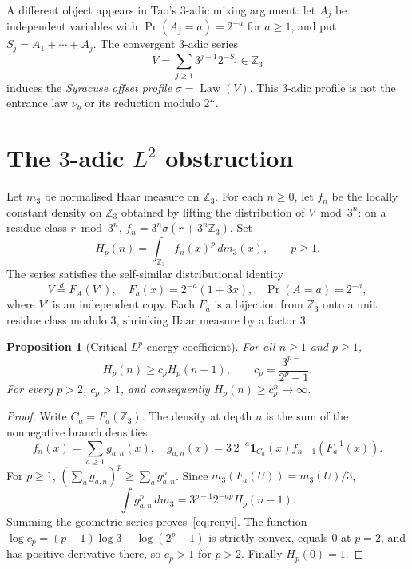 \documentclass[10pt]{amsart}
\newtheorem{proposition}[theorem]{Proposition}
\theoremstyle{definition}\newtheorem{definition}[theorem]{Definition}
\theoremstyle{remark}\newtheorem{remark}[theorem]{Remark}
\newcommand{\Z}{\mathbb Z}
\newcommand{\one}{\mathbf1}
\begin{document}
A different object appears in Tao's $3$-adic mixing argument: let $A_j$ be independent variables with $\Pr(A_j=a)=2^{-a}$ for $a\ge1$, and put $S_j=A_1+\cdots+A_j$. The convergent $3$-adic series
\begin{equation}\label{eq:V}
 V=\sum_{j\ge1}3^{j-1}2^{-S_j}\in\Z_3
\end{equation}
induces the \emph{Syracuse offset profile} $\sigma=\operatorname{Law}(V)$. This $3$-adic profile is not the entrance law $\nu_b$ or its reduction modulo $2^L$.

\section{The $3$-adic $L^2$ obstruction}
Let $m_3$ be normalised Haar measure on $\Z_3$. For each $n\ge0$, let $f_n$ be the locally constant density on $\Z_3$ obtained by lifting the distribution of $V\bmod3^n$: on a residue class $r\bmod3^n$, $f_n=3^n\sigma(r+3^n\Z_3)$. Set
\[
 H_p(n)=\int_{\Z_3}f_n(x)^p\,dm_3(x),\qquad p\ge1.
\]
The series satisfies the self-similar distributional identity
\begin{equation}\label{eq:ifs}
 V\stackrel d=F_A(V'),\quad F_a(x)=2^{-a}(1+3x),\quad\Pr(A=a)=2^{-a},
\end{equation}
where $V'$ is an independent copy. Each $F_a$ is a bijection from $\Z_3$ onto a unit residue class modulo $3$, shrinking Haar measure by a factor $3$.

\begin{proposition}[Critical $L^p$ energy coefficient]\label{prop:p}
For all $n\ge1$ and $p\ge1$,
\begin{equation}\label{eq:renyi}
 H_p(n)\ge c_p H_p(n-1),\qquad c_p=\frac{3^{p-1}}{2^p-1}.
\end{equation}
For every $p>2$, $c_p>1$, and consequently $H_p(n)\ge c_p^n\to\infty$.
\end{proposition}
\begin{proof}
Write $C_a=F_a(\Z_3)$. The density at depth $n$ is the sum of the nonnegative branch densities
\[
 f_n(x)=\sum_{a\ge1}g_{a,n}(x),\quad
 g_{a,n}(x)=3\,2^{-a}\one_{C_a}(x) f_{n-1}(F_a^{-1}(x)).
\]
For $p\ge1$, $(\sum_a g_{a,n})^p\ge\sum_a g_{a,n}^p$. Since $m_3(F_a(U))=m_3(U)/3$,
\[
 \int g_{a,n}^p\,dm_3=3^{p-1}2^{-ap}H_p(n-1).
\]
Summing the geometric series proves~\eqref{eq:renyi}. The function $\log c_p=(p-1)\log3-\log(2^p-1)$ is strictly convex, equals $0$ at $p=2$, and has positive derivative there, so $c_p>1$ for $p>2$. Finally $H_p(0)=1$.
\end{proof}
\end{document}
